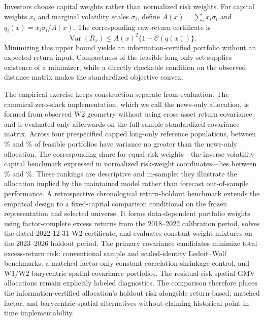Investors choose capital weights rather than normalized risk weights.
For capital weights $x_i$ and marginal volatility scales $\sigma_i$,
define $A(x)=\sum_i x_i\sigma_i$ and $q_i(x)=x_i\sigma_i/A(x)$.
The corresponding raw-return certificate is
\[
  \operatorname{Var}(R_x)
  \le A(x)^2\{1-\mathcal C(q(x))\}.
\]
Minimizing this upper bound yields an information-certified portfolio without
an expected-return input.
Compactness of the feasible long-only set supplies existence of a
minimizer, while a directly checkable condition on the observed
distance matrix makes the standardized objective convex.

The empirical exercise keeps construction separate from evaluation.
The canonical zero-slack implementation, which we call the news-only
allocation, is formed from observed W2 geometry without using cross-asset return
covariance and is evaluated only afterwards on the full-sample standardized
covariance matrix.
Across four prespecified capped long-only reference populations,
between \% and
\% of feasible
portfolios have variance no greater than the news-only allocation.
The corresponding share for equal risk weights---the inverse-volatility capital
benchmark expressed in normalized risk-weight coordinates---lies between
\% and
\%.
These rankings are descriptive and in-sample; they illustrate the
allocation implied by the maintained model rather than forecast
out-of-sample performance.
A retrospective chronological return-holdout benchmark extends the empirical
design to a fixed-capital comparison conditional on the frozen representation
and selected universe. It forms data-dependent portfolio weights using
factor-complete excess returns from the 2018--2022 calibration period, solves
the dated 2022-12-31 W2 certificate, and evaluates constant-weight mixtures on
the 2023--2026 holdout period. The primary covariance candidates minimize
total excess-return risk: conventional sample and scaled-identity
Ledoit--Wolf benchmarks, a matched factor-only constant-correlation
shrinkage control, and W1/W2 barycentric spatial-covariance portfolios. The
residual-risk spatial GMV allocations remain explicitly labeled diagnostics.
The comparison therefore places the information-certified allocation's
holdout risk alongside return-based, matched factor, and barycentric spatial
alternatives without claiming historical point-in-time implementability.

